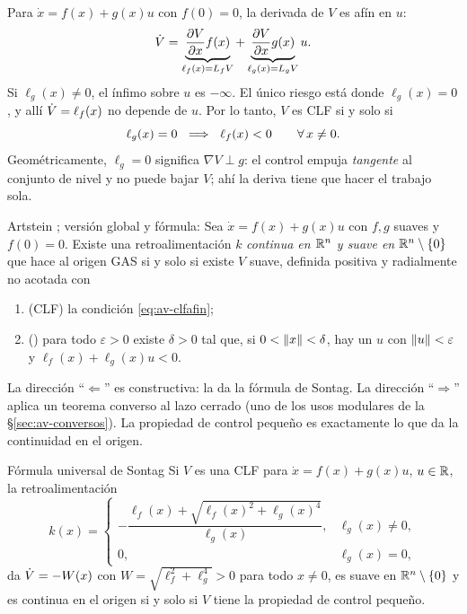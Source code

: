 Para $\dot x=f(x)+g(x)u$ con $f(0)=0$, la derivada de $V$ es afín en $u$:
\[
  \dot V=\underbrace{\frac{\partial V}{\partial x}f(x)}_{\ell_f(x)=L_{f}V}+\underbrace{\frac{\partial V}{\partial x}g(x)}_{\ell_g(x)=L_{g}V}u .
\]
Si $\ell_g(x)\neq0$, el ínfimo sobre $u$ es $-\infty$. El único riesgo está donde $\ell_g(x)=0$, y allí $\dot V=\ell_f(x)$ no depende de $u$. Por lo tanto, $V$ es CLF si y solo si
\begin{equation}
  \ell_g(x)=0\ \implica\ \ell_f(x)<0\qquad\forall\,x\neq0 .
  \label{eq:av-clfafin}
\end{equation}
Geométricamente, $\ell_g=0$ significa $\nabla V\perp g$: el control empuja \emph{tangente} al conjunto de nivel y no puede bajar $V$; ahí la deriva tiene que hacer el trabajo sola.

\begin{teorema}[label=thm:av-artstein]{Artstein \citep{Ars83}; versión global y fórmula: \citet{Son89}}
Sea $\dot x=f(x)+g(x)u$ con $f,g$ suaves y $f(0)=0$. Existe una retroalimentación $k$ \emph{continua en $\mathbb{R}^n$ y suave en $\mathbb{R}^n\setminus\{0\}$} que hace al origen GAS si y solo si existe $V$ suave, definida positiva y radialmente no acotada con
\begin{enumerate}
  \item (CLF) la condición \eqref{eq:av-clfafin};
  \item () para todo $\varepsilon>0$ existe $\delta>0$ tal que, si $0<\left\lVert x\right\rVert<\delta$, hay un $u$ con $\left\lVert u\right\rVert<\varepsilon$ y $\ell_f(x)+\ell_g(x)u<0$.
\end{enumerate}
\end{teorema}

La dirección ``$\Leftarrow$'' es constructiva: la da la fórmula de Sontag. La dirección ``$\Rightarrow$'' aplica un teorema converso al lazo cerrado (uno de los usos modulares de la \S\ref{sec:av-conversos}). La propiedad de control pequeño es exactamente lo que da la continuidad en el origen.

\begin{proposicion}[label=prop:av-sontag]{Fórmula universal de Sontag \citep{Son89}}
Si $V$ es una CLF para $\dot x=f(x)+g(x)u$, $u\in\mathbb{R}$, la retroalimentación
\begin{equation}
  k(x)=\begin{cases}-\dfrac{\ell_f(x)+\sqrt{\ell_f(x)^2+\ell_g(x)^4}}{\ell_g(x)}, & \ell_g(x)\neq0,\\[8pt] 0, & \ell_g(x)=0,\end{cases}
  \label{eq:av-sontag}
\end{equation}
da $\dot V=-W(x)$ con $W=\sqrt{\ell_f^2+\ell_g^4}>0$ para todo $x\neq0$, es suave en $\mathbb{R}^n\setminus\{0\}$ y es continua en el origen si y solo si $V$ tiene la propiedad de control pequeño.
\end{proposicion}

